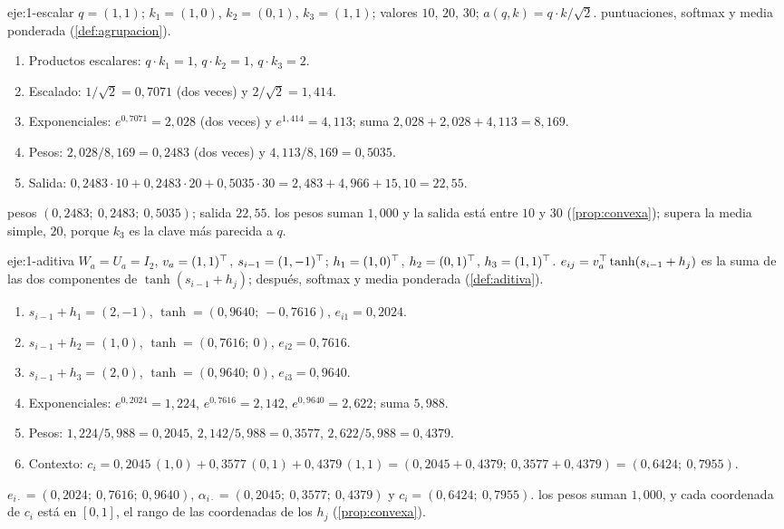 \begin{solucion}{eje:1-escalar}
\datos $q=(1,1)$; $k_1=(1,0)$, $k_2=(0,1)$, $k_3=(1,1)$; valores $10$, $20$, $30$; $a(q,k)=q\cdot k/\sqrt2$.
\planteamiento puntuaciones, softmax y media ponderada (\cref{def:agrupacion}).
\pasos
\begin{enumerate}[label=\arabic*.]
  \item Productos escalares: $q\cdot k_1=1$, $q\cdot k_2=1$, $q\cdot k_3=2$.
  \item Escalado: $1/\sqrt2=0{,}7071$ (dos veces) y $2/\sqrt2=1{,}414$.
  \item Exponenciales: $e^{0{,}7071}=2{,}028$ (dos veces) y $e^{1{,}414}=4{,}113$; suma $2{,}028+2{,}028+4{,}113=8{,}169$.
  \item Pesos: $2{,}028/8{,}169=0{,}2483$ (dos veces) y $4{,}113/8{,}169=0{,}5035$.
  \item Salida: $0{,}2483\cdot 10+0{,}2483\cdot 20+0{,}5035\cdot 30=2{,}483+4{,}966+15{,}10=22{,}55$.
\end{enumerate}
\resultado pesos \textbf{$(0{,}2483;\allowbreak\ 0{,}2483;\allowbreak\ 0{,}5035)$}; salida \textbf{$22{,}55$}.
\comprobacion los pesos suman $1{,}000$ y la salida está entre $10$ y $30$ (\cref{prop:convexa}); supera la media simple, $20$, porque $k_3$ es la clave más parecida a $q$.
\end{solucion}

\begin{solucion}{eje:1-aditiva}
\datos $W_a=U_a=I_2$, $v_a=(1,1)^{\top}$, $s_{i-1}=(1,-1)^{\top}$; $h_1=(1,0)^{\top}$, $h_2=(0,1)^{\top}$, $h_3=(1,1)^{\top}$.
\planteamiento $e_{ij}=v_a^{\top}\tanh(s_{i-1}+h_j)$ es la suma de las dos componentes de $\tanh(s_{i-1}+h_j)$; después, softmax y media ponderada (\cref{def:aditiva}).
\pasos
\begin{enumerate}[label=\arabic*.]
  \item $s_{i-1}+h_1=(2,-1)$, $\tanh=(0{,}9640;\allowbreak\ -0{,}7616)$, $e_{i1}=0{,}2024$.
  \item $s_{i-1}+h_2=(1,0)$, $\tanh=(0{,}7616;\allowbreak\ 0)$, $e_{i2}=0{,}7616$.
  \item $s_{i-1}+h_3=(2,0)$, $\tanh=(0{,}9640;\allowbreak\ 0)$, $e_{i3}=0{,}9640$.
  \item Exponenciales: $e^{0{,}2024}=1{,}224$, $e^{0{,}7616}=2{,}142$, $e^{0{,}9640}=2{,}622$; suma $5{,}988$.
  \item Pesos: $1{,}224/5{,}988=0{,}2045$, $2{,}142/5{,}988=0{,}3577$, $2{,}622/5{,}988=0{,}4379$.
  \item Contexto: $c_i=0{,}2045\,(1,0)+0{,}3577\,(0,1)+0{,}4379\,(1,1)=(0{,}2045+0{,}4379;\allowbreak\ 0{,}3577+0{,}4379)=(0{,}6424;\allowbreak\ 0{,}7955)$.
\end{enumerate}
\resultado $e_{i\cdot}=(0{,}2024;\allowbreak\ 0{,}7616;\allowbreak\ 0{,}9640)$, $\alpha_{i\cdot}=(0{,}2045;\allowbreak\ 0{,}3577;\allowbreak\ 0{,}4379)$ y \textbf{$c_i=(0{,}6424;\allowbreak\ 0{,}7955)$}.
\comprobacion los pesos suman $1{,}000$, y cada coordenada de $c_i$ está en $[0,1]$, el rango de las coordenadas de los $h_j$ (\cref{prop:convexa}).
\end{solucion}

